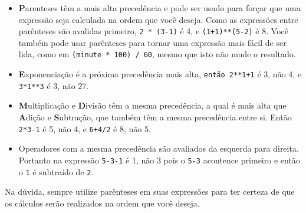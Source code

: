 \begin{itemize}

\item {\bf P}arenteses têm a mais alta precedência e pode ser usado 
para forçar que uma expressão seja calculada na ordem que você deseja. Como as 
expressões entre parênteses são avalidas primeiro, {\tt 2 * (3-1)} é 4, 
e {\tt (1+1)**(5-2)} é 8. Você também pode usar parênteses para tornar uma 
expressão mais fácil de ser lida, como em {\tt (minute * 100) / 60}, mesmo 
que isto não mude o resultado.

\item {\bf E}xponenciação é a próxima precedência mais alta,
{\tt então 2**1+1} é 3, não 4, e {\tt 3*1**3} é 3, não 27.

\item {\bf M}ultiplicação e {\bf D}ivisão têm a mesma precedência,
a qual é mais alta que {\bf A}dição e {\bf S}ubtração, que também 
têm a mesma precedência entre si. Então {\tt 2*3-1} é 5, não 4, e 
{\tt6+4/2} é 8, não 5.


\item Operadores com a mesma precedência são avaliados da esquerda para 
direita. Portanto na expressão {\tt 5-3-1} é 1, não 3 pois o 
{\tt 5-3} acontence primeiro e então o {\tt 1} é subtraído de {\tt 2}.

\end{itemize}

Na dúvida, sempre utilize parênteses em suas expressões para ter certeza 
de que os cálculos serão realizados na ordem que você deseja.

